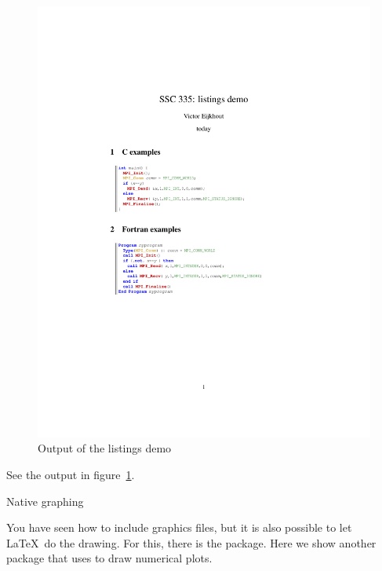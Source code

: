 \begin{figure}[ht]
  \includegraphics[scale=.75]{code/latexdemo/listing}
  \caption{Output of the listings demo}
  \label{fig:latex-listing}
\end{figure}

See the output in figure~\ref{fig:latex-listing}.

 {Native graphing}

You have seen how to include graphics files,
but it is also possible to let \LaTeX\ do the drawing.
For this, there is the  package.
Here we show another package 
that uses  to draw numerical plots.

\begin{multicols}{2}
\end{multicols}


